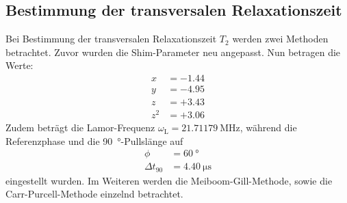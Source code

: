 \subsection{Bestimmung der transversalen Relaxationszeit}
Bei Bestimmung der transversalen Relaxationszeit $T_2$ werden zwei Methoden
betrachtet. Zuvor wurden die Shim-Parameter neu angepasst. Nun betragen die Werte:
\begin{align*}
  x &= -\num{1.44} \\
  y &= -\num{4.95} \\
  z &= +\num{3.43} \\
  z^2 &= +\num{3.06}
\end{align*}
Zudem beträgt die Lamor-Frequenz $\omega_\text{L} = \SI{21.71179}{\mega\hertz}$, während die
Referenzphase und die \SI{90}{\degree}-Pullslänge auf
\begin{align*}
  \phi &= \SI{60}{\degree} \\
  \Delta t_{90} &= \SI{4.40}{\micro\second}
\end{align*}
eingestellt wurden.
Im Weiteren werden die Meiboom-Gill-Methode, sowie die Carr-Purcell-Methode
einzelnd betrachtet.

